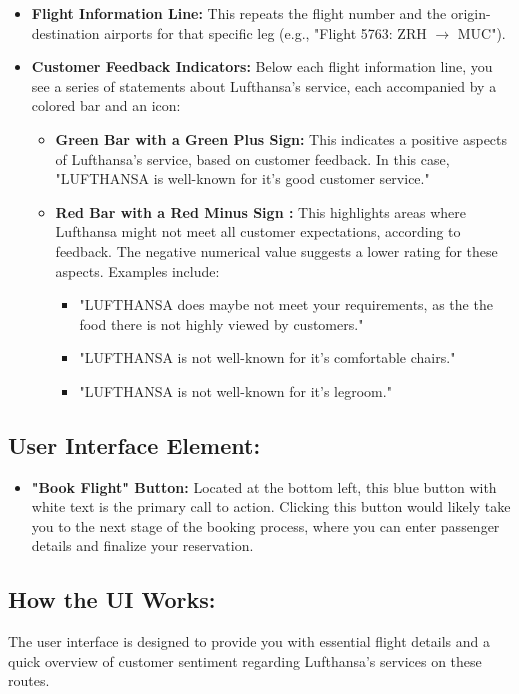 \documentclass[a4paper]{article}
\begin{document}
\begin{itemize}
    \item \textbf{Flight Information Line:} This repeats the flight number and the origin-destination airports for that specific leg (e.g., "Flight 5763: ZRH $\longrightarrow$ MUC").
    \item \textbf{Customer Feedback Indicators:} Below each flight information line, you see a series of statements about Lufthansa's service, each accompanied by a colored bar and an icon:
    \begin{itemize}
        \item \textbf{Green Bar with a Green Plus Sign:} This indicates a positive aspects of Lufthansa's service, based on customer feedback.  In this case, "LUFTHANSA is well-known for it's good customer service."
        \item \textbf{Red Bar with a Red Minus Sign :} This highlights areas where Lufthansa might not meet all customer expectations, according to feedback. The negative numerical value suggests a lower rating for these aspects. Examples include:
        \begin{itemize}
            \item "LUFTHANSA does maybe not meet your requirements, as the the food there is not highly viewed by customers."
            \item "LUFTHANSA is not well-known for it's comfortable chairs."
            \item "LUFTHANSA is not well-known for it's legroom."
        \end{itemize}
    \end{itemize}
\end{itemize}

\subsection{User Interface Element: }
\begin{itemize}
    \item \textbf{"Book Flight" Button:} Located at the bottom left, this blue button with white text is the primary call to action. Clicking this button would likely take you to the next stage of the booking process, where you can enter passenger details and finalize your reservation.
\end{itemize}

\subsection{How the UI Works: }
The user interface is designed to provide you with essential flight details and a quick overview of customer sentiment regarding Lufthansa's services on these routes.
\end{document}
